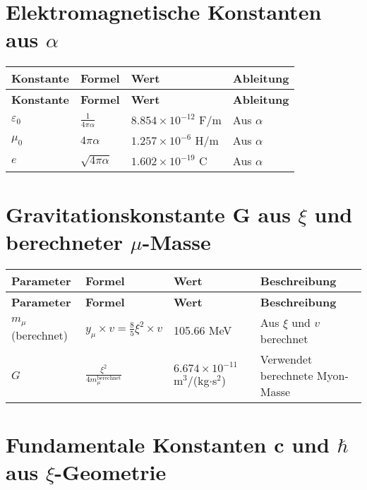 \documentclass[12pt,a4paper]{article}
\begin{document}
	\section{Elektromagnetische Konstanten aus \(\alpha\)}
	
	\begin{longtable}{|p{3cm}|p{4cm}|p{4cm}|p{3cm}|}
		\hline
		\textbf{Konstante} & \textbf{Formel} & \textbf{Wert} & \textbf{Ableitung} \\
		\hline
		\endfirsthead
		\hline
		\textbf{Konstante} & \textbf{Formel} & \textbf{Wert} & \textbf{Ableitung} \\
		\hline
		\endhead
		\(\varepsilon_0\) & \(\frac{1}{4\pi\alpha}\) & \(8.854 \times 10^{-12}\) F/m & Aus \(\alpha\) \\
		\hline
		\(\mu_0\) & \(4\pi\alpha\) & \(1.257 \times 10^{-6}\) H/m & Aus \(\alpha\) \\
		\hline
		\(e\) & \(\sqrt{4\pi\alpha}\) & \(1.602 \times 10^{-19}\) C & Aus \(\alpha\) \\
		\hline
	\end{longtable}
	
	\section{Gravitationskonstante G aus \(\xi\) und berechneter \(\mu\)-Masse}
	
	\begin{longtable}{|p{3cm}|p{5cm}|p{4cm}|p{3cm}|}
		\hline
		\textbf{Parameter} & \textbf{Formel} & \textbf{Wert} & \textbf{Beschreibung} \\
		\hline
		\endfirsthead
		\hline
		\textbf{Parameter} & \textbf{Formel} & \textbf{Wert} & \textbf{Beschreibung} \\
		\hline
		\endhead
		\(m_{\mu}\) (berechnet) & \(y_{\mu} \times v = \frac{8}{5}\xi^{2} \times v\) & 105.66 MeV & Aus \(\xi\) und \(v\) berechnet \\
		\hline
		\(G\) & \(\frac{\xi^{2}}{4m_{\mu}^{\text{berechnet}}}\) & \(6.674 \times 10^{-11}\) m\(^3\)/(kg\(\cdot\)s\(^2\)) & Verwendet berechnete Myon-Masse \\
		\hline
	\end{longtable}
	
	\section{Fundamentale Konstanten c und \(\hbar\) aus \(\xi\)-Geometrie}
	
\end{document}
